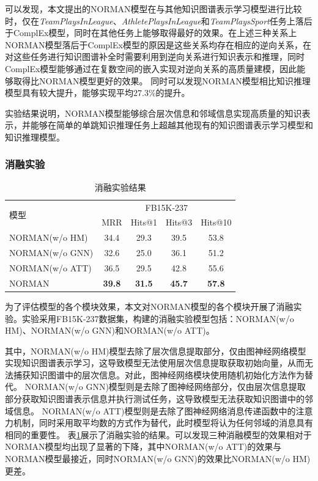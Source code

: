 \documentclass[algorithmlist, AutoFakeBold, AutoFakeSlant, figurelist, tablelist, nomlist, engineering, openany]{seuthesix} %
\begin{document}
可以发现，本文提出的NORMAN模型在与其他知识图谱表示学习模型进行比较时，仅在\textit{TeamPlaysInLeague}、\textit{AthletePlaysInLeague}和\textit{TeamPlaysSport}任务上落后于ComplEx模型，同时在其他任务上能够取得最好的效果。在上述三种关系上NORMAN模型落后于ComplEx模型的原因是这些关系均存在相应的逆向关系，在对这些任务进行知识图谱补全时需要利用到逆向关系进行知识表示和推理，同时ComplEx模型能够通过在复数空间的嵌入实现对逆向关系的高质量建模，因此能够取得比NORMAN模型更好的效果。
同时可以发现NORMAN模型相比知识推理模型具有较大提升，能够实现平均$27.3\%$的提升。

实验结果说明，NORMAN模型能够综合层次信息和邻域信息实现高质量的知识表示，并能够在简单的单跳知识推理任务上超越其他现有的知识图谱表示学习模型和知识推理模型。

\subsubsection{消融实验}
\begin{table}[t]
  \centering
  \caption{消融实验结果}
  \begin{tabular*}{0.95\textwidth}{@{\extracolsep{\fill}}lcccc}
    \toprule[1pt]
    \multirow{2}{*}{模型} & \multicolumn{4}{c}{FB15K-237} \\
      & MRR & Hits@1 & Hits@3 & Hits@10 \\ \hline
    NORMAN(w/o HM) & 34.4 & 29.3 & 39.5 & 53.8 \\
    NORMAN(w/o GNN) & 32.6 & 25.0 & 36.1 & 51.2 \\
    NORMAN(w/o ATT) & 36.5 & 29.5 & 42.8 & 55.6 \\
    NORMAN & \textbf{39.8} & \textbf{31.5} & \textbf{45.7} & \textbf{57.8} \\
    \bottomrule[1pt]
  \end{tabular*}
  \label{Experiment1_ablation}
\end{table}

为了评估模型的各个模块效果，本文对NORMAN模型的各个模块开展了消融实验。实验采用FB15K-237数据集，构建的消融实验模型包括：NORMAN(w/o HM)、NORMAN(w/o GNN)和NORMAN(w/o ATT)。

其中，NORMAN(w/o HM)模型去除了层次信息提取部分，仅由图神经网络模型实现知识图谱表示学习，这导致模型无法使用层次信息提取获取初始向量，从而无法捕获知识图谱中的层次信息。对此，图神经网络模块使用随机初始化方法作为替代。
NORMAN(w/o GNN)模型则是去除了图神经网络部分，仅由层次信息提取部分获取知识图谱表示信息并执行测试任务，这导致模型无法获取知识图谱中的邻域信息。
NORMAN(w/o ATT)模型则是去除了图神经网络消息传递函数中的注意力机制，同时采用取平均数的方式作为替代，此时模型将认为任何邻域的消息具有相同的重要性。
表\ref{Experiment1_ablation}展示了消融实验的结果。可以发现三种消融模型的效果相对于NORMAN模型均出现了显著的下降，其中NORMAN(w/o ATT)的效果与NORMAN模型最接近，同时NORMAN(w/o GNN)的效果比NORMAN(w/o HM)更差。
\end{document}
